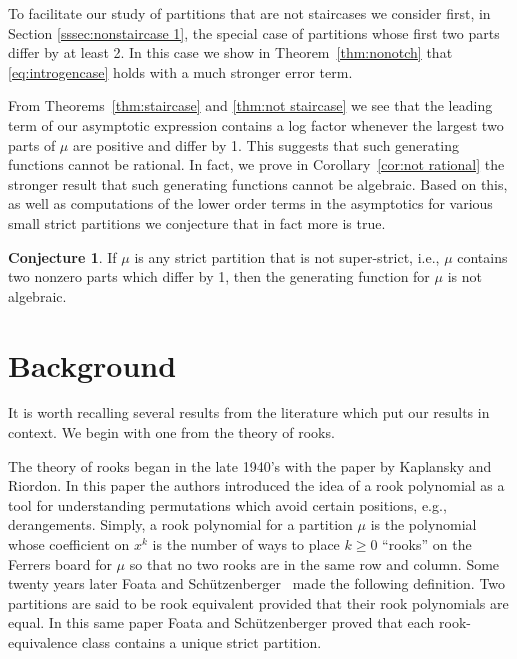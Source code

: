 \documentclass{article}
\theoremstyle{plain}
\theoremstyle{definition}
\newtheorem{conjecture}[theorem]{Conjecture}
\begin{document}
To facilitate our study of partitions that are not staircases we consider first, in Section \ref{sssec:nonstaircase 1}, the special case of partitions whose first two parts differ by at least 2.  In this case we show in Theorem~\ref{thm:nonotch} that \eqref{eq:introgencase} holds with a much stronger error term.

From Theorems~\ref{thm:staircase} and \ref{thm:not staircase} we see that the leading term of our asymptotic expression contains a log factor whenever the largest two parts of $\mu$ are positive and differ by 1.  This suggests that such generating functions cannot be rational.  In fact, we prove in  Corollary~\ref{cor:not rational} the stronger result that such generating functions cannot be algebraic.  Based on this, as well as computations of the lower order terms in the asymptotics for various small strict partitions we conjecture that in fact more is true.

\begin{conjecture}
If $\mu$ is any strict partition that is not super-strict, i.e., $\mu$ contains two nonzero parts which differ by 1, then the generating function for $\mu$ is not algebraic.
\end{conjecture}





\section{Background} \label{sec:background}
It is worth recalling several results from the literature which put our results in context.  We begin with one from the theory of rooks.  

The theory of rooks began in the late 1940's with the paper \cite{kaplansky1946problem} by Kaplansky and Riordon.  In this paper the authors introduced the idea of a rook polynomial as a tool for understanding permutations which avoid certain positions, e.g., derangements.  Simply, a rook polynomial for a partition $\mu$ is the polynomial whose coefficient on $x^k$ is the number of ways to place $k\geq 0$ ``rooks'' on the Ferrers board for $\mu$ so that no two rooks are in the same row and column.  Some twenty years later Foata and Sch\"{u}tzenberger~\cite{foata1970rook} made the following definition.  Two partitions are said to be rook equivalent provided that their rook polynomials are equal. In this same paper Foata and Sch\"{u}tzenberger proved that each rook-equivalence class contains a unique strict partition.  
\end{document}
